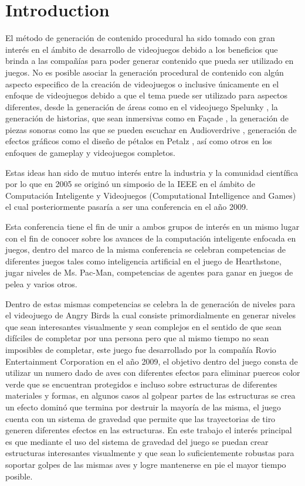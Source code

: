 \chapter{Introduction}
\label{chapter:introduction}

El método de generación de contenido procedural ha sido tomado con
gran interés en el ámbito de desarrollo de videojuegos debido a los beneficios
que brinda a las compañías para poder generar contenido que pueda ser utilizado
en juegos. No es posible asociar la generación procedural de contenido con algún
aspecto especifico de la creación de videojuegos o inclusive únicamente en el
enfoque de videojuegos debido a que el tema puede ser utilizado para 
aspectos diferentes, desde la generación de áreas como en el videojuego Spelunky
\cite{RovioEntertainmentCorporation2009} \cite{Mossmouth2013}
\cite{Mossmouth2013}, la generación de historias, que sean inmersivas como en
Façade \cite{Mateas}, la generación de piezas sonoras como las que se pueden 
escuchar en Audioverdrive \cite{Holtar}, generación de efectos gráficos como
el diseño de pétalos en Petalz \cite{Risi2012}, así como otros en los enfoques
de gameplay y videojuegos completos.

Estas ideas han sido de mutuo interés entre la industria y la comunidad
científica por lo que en 2005 se originó un simposio de la IEEE en el ámbito de
Computación Inteligente y Videojuegos (Computational Intelligence and Games) el
cual posteriormente pasaría a ser una conferencia en el año 2009.

Esta conferencia tiene el fin de unir a ambos grupos de interés en un mismo
lugar con el fin de conocer sobre los avances de la computación inteligente
enfocada en juegos, dentro del marco de la misma conferencia se celebran
competencias de diferentes juegos tales como inteligencia artificial en el juego
de Hearthstone, jugar niveles de Ms. Pac-Man, competencias de agentes para ganar
en juegos de pelea y varios otros.

Dentro de estas mismas competencias se celebra la de generación de niveles para
el videojuego de Angry Birds la cual consiste primordialmente en generar niveles
que sean interesantes visualmente y sean complejos en el sentido de que sean
difíciles de completar por una persona pero que al mismo tiempo no sean
imposibles de completar, este juego fue desarrollado por la compañía Rovio
Entertainment Corporation\cite{RovioEntertainmentCorporation2009} en el año
2009, el objetivo dentro del juego consta de utilizar un numero dado de aves con
diferentes efectos para eliminar puercos color verde que se encuentran
protegidos e incluso sobre estructuras de diferentes materiales y formas, en
algunos casos al golpear partes de las estructuras se crea un efecto dominó que
termina por destruir la mayoría de las misma, el juego cuenta con un
sistema de gravedad que permite que las trayectorias de tiro generen diferentes
efectos en las estructuras. En este trabajo el interés principal es que mediante el
uso del sistema de gravedad del juego se puedan crear estructuras
interesantes visualmente y que sean lo suficientemente robustas para soportar
golpes de las mismas aves y logre mantenerse en pie el mayor tiempo posible.

